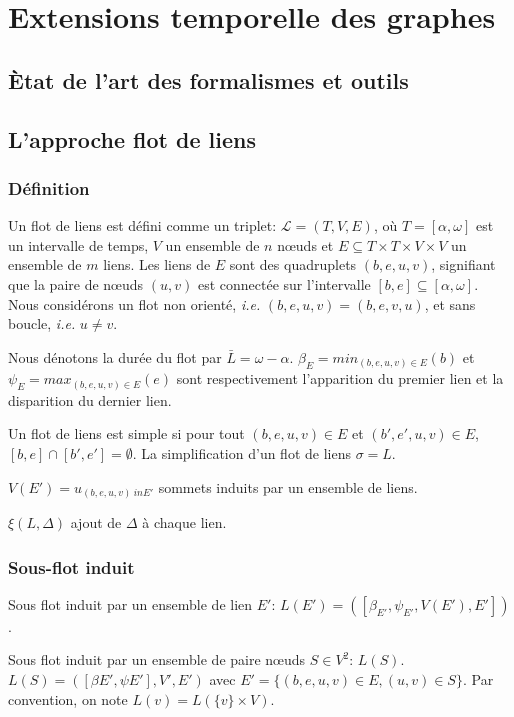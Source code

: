 \chapter{Extensions temporelle des graphes}

\section{\`Etat de l'art des formalismes et outils}

\section{L'approche flot de liens}
\subsection{Définition}
\label{sec:definition}
Un flot de liens est défini comme un triplet: $\mathcal{L}=(T,V,E)$, où $T=[\alpha, \omega]$ est un intervalle de temps, $V$ un ensemble de $n$ n\oe uds et $E\subseteq T\times T \times V \times V$ un ensemble de $m$ liens.
Les liens de $E$ sont des quadruplets $(b,e,u,v)$, signifiant que la paire de n\oe uds $(u, v)$ est connectée sur l'intervalle $[b,e] \subseteq [\alpha,\omega]$.
Nous considérons un flot non orienté, \emph{i.e.} $(b,e,u,v)=(b,e,v,u)$, et sans boucle, \emph{i.e.} $u \neq v$.


Nous dénotons la durée du flot par $\bar{L}=\omega-\alpha$.
$\beta_E= min_{(b,e,u,v) \in E} (b)$ et $\psi_E= max_{(b,e,u,v) \in E} (e)$ sont respectivement l'apparition du premier lien et la disparition du dernier lien.

Un flot de liens est simple si pour tout $(b,e,u,v) \in E$ et $(b',e',u, v) \in E$, $[b,e]\cap [b', e'] = \emptyset$.
La simplification d'un flot de liens $\sigma=L$.

$V(E')= {u}_{(b,e,u,v) \ in E'}$ sommets induits par un ensemble de liens.


$\xi(L,\Delta)$ ajout de $\Delta$ à chaque lien.

\subsection{Sous-flot induit}
Sous flot induit par un ensemble de lien $E'$: $L(E')=([\beta_{E'},\psi_{E'},V(E'),E'])$.


 
Sous flot induit par un ensemble de paire n\oe uds  $S \in V^ 2$: $L(S)$.
$L(S)=([\beta{E'},\psi{E'}],V',E')$ avec $E'= \{(b,e,u,v) \in E, (u,v) \in S\}$.
Par convention, on note $L(v)= L(\{v\}\times V)$.

